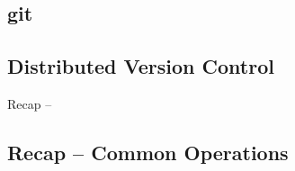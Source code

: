 
\subsection{git}




\subsection{Distributed Version Control}
\begin{frame}{Recap -- \insertsubsection}
	\slideDistributedVC
\end{frame}

\subsection{Recap -- Common Operations}

\slideCloneFetch{}

\slideCommitPush{}

